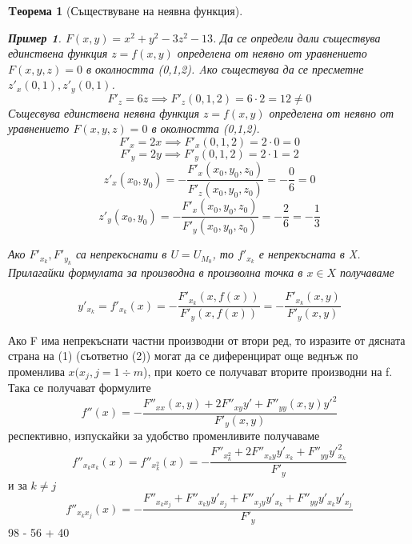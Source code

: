 \documentclass[fleqn,12pt]{article}
\newtheorem{theorem}{Tеорема}[subsection]
\newtheorem{example}{Пример}[subsection]
\begin{document}
\begin{theorem}[Съществуване на неявна функция]
\begin{example}
$F(x,y) = x^2 + y^2 - 3z^2 - 13 $. Да се определи дали съществува единствена функция $z = f(x,y)$ определена от неявно от уравнението $F(x,y,z) = 0$ в околността (0,1,2). Aко съществува да се пресметне $z'_x(0,1), z'_y(0,1)$. \\
$$F'_z = 6z \implies F'_z (0,1,2) = 6 \cdot 2 = 12 \neq 0$$
Същесвува единствена неявна функция $z = f(x,y)$ определена от неявно от уравнението $F(x,y,z) = 0$ в околността (0,1,2).
$$F'_x = 2x \implies F'_x (0,1,2) = 2 \cdot 0 = 0 $$
$$F'_y = 2y \implies F'_y (0,1,2) = 2 \cdot 1 = 2 $$
$$z'_x(x_0,y_0) = - \dfrac{F'_x(x_0,y_0,z_0)}{F'_z(x_0,y_0, z_0)} = - \dfrac{0}{6} = 0$$
$$z'_y(x_0,y_0) = - \dfrac{F'_x(x_0,y_0,z_0)}{F'_y(x_0,y_0, z_0)} = - \dfrac{2}{6} = - \dfrac{1}{3}$$
\end{example}

Ако $F'_{x_k}, F'_{y_k}$ са непрекъснати в $U = U_{M_0}$, то $f'_{x_k}$ е непрекъсната в X. Прилагайки формулата за производна в произволна точка в $x \in X$ получаваме

\begin{equation}
y'_{x_k} = f'_{x_k}(x) = - \dfrac{F'_{x_k}(x,f(x))}{F'_y(x,f(x))} = - \dfrac{F'_{x_k}(x,y)}{F'_y(x,y)}
\end{equation}

\end{theorem}
Ако F има непрекъснати частни производни от втори ред, то изразите от дясната страна на (1) (съответно (2)) могат да се диференцират още веднъж по променлива $x (x_j, j = 1 \div m $), при което се получават вторите производни на f. Така се получават формулите
$$f''(x) = - \dfrac{F''_{xx}(x,y) + 2F''_{xy}y' + F''_{yy}(x,y)y'^2}{F'_y(x,y)}$$
респективно, изпускайки за удобство променливите получаваме
$$f''_{{x_k}{x_k}} (x) = f''_{x_k^2}(x) = - \dfrac{F''_{x_k^2} + 2F''_{{x_k}y} y'_{x_k} + F''_{yy} y'^2 _{x_k}}{F'_y} $$
и за $k \neq j$
$$f''_{{x_k}{x_j}} (x) = - \dfrac{ F''_{{x_k}{x_j}} + F''_{{x_k}y}y'_{x_j} +  F''_{{x_j}y}y'_{x_k} + F''_{yy} y'_{x_k} y'_{x_j} }
{F'_y} $$
98 - 56 + 40
\end{document}
